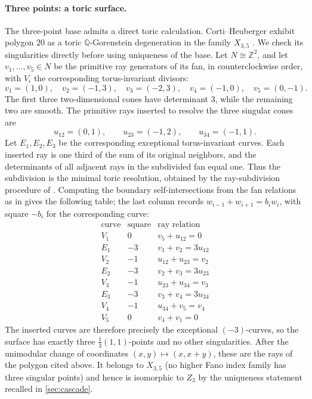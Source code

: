 \documentclass[11pt]{article}
\theoremstyle{plain}
\theoremstyle{definition}
\theoremstyle{remark}
\newcommand{\Z}{\mathbb Z}
\begin{document}

\paragraph{Three points: a toric surface.}
The three-point base admits a direct toric calculation.
\label{app:brauer-three}
Corti--Heuberger exhibit polygon \(20\) as a toric \(\mathbb Q\)-Gorenstein degeneration in the
family \(X_{3,5}\)
\cite[Section~7, Table~4 and Figure~11]{Corti2016}. We check its
singularities directly before using uniqueness of the base. Let
\(N\cong\Z^2\), and let
\(v_1,\dots,v_5\in N\) be the primitive ray generators of its fan, in
counterclockwise order, with \(V_i\) the corresponding torus-invariant
divisors:
\[
v_1=(1,0),\quad
v_2=(-1,3),\quad
v_3=(-2,3),\quad
v_4=(-1,0),\quad
v_5=(0,-1).
\]
The first three two-dimensional cones have determinant \(3\), while the
remaining two are smooth. The primitive rays inserted to resolve the three
singular cones are
\[
u_{12}=(0,1),\qquad
u_{23}=(-1,2),\qquad
u_{34}=(-1,1).
\]
Let \(E_1,E_2,E_3\) be the corresponding exceptional torus-invariant
curves. Each inserted ray is one third of the sum of its original
neighbors, and the determinants of all adjacent rays in the subdivided
fan equal one. Thus the subdivision is the minimal toric resolution,
obtained by the ray-subdivision procedure of
\cite[Chapters~10--11]{CoxLittleSchenck2011}. Computing the boundary
self-intersections from the fan relations as in
\cite[Theorem~10.4.4]{CoxLittleSchenck2011} gives the following table;
the last column records \(w_{i-1}+w_{i+1}=b_iw_i\), with square
\(-b_i\) for the corresponding curve:
\[
\begin{array}{c|r|l}
\text{curve}&\text{square}&\text{ray relation}\\ \hline
V_1&0&v_5+u_{12}=0\\
E_1&-3&v_1+v_2=3u_{12}\\
V_2&-1&u_{12}+u_{23}=v_2\\
E_2&-3&v_2+v_3=3u_{23}\\
V_3&-1&u_{23}+u_{34}=v_3\\
E_3&-3&v_3+v_4=3u_{34}\\
V_4&-1&u_{34}+v_5=v_4\\
V_5&0&v_4+v_1=0
\end{array}
\]
The inserted curves are therefore precisely the exceptional \((-3)\)-curves,
so the surface has exactly three \(\frac13(1,1)\)-points and no other
singularities.
After the unimodular change of coordinates
\((x,y)\mapsto(x,x+y)\), these are the rays of the polygon cited above.
It belongs to \(X_{3,5}\) (no higher Fano index family has three singular
points) and hence is isomorphic to \(Z_3\) by the
uniqueness statement recalled in \cref{sec:cascade}.
\end{document}
